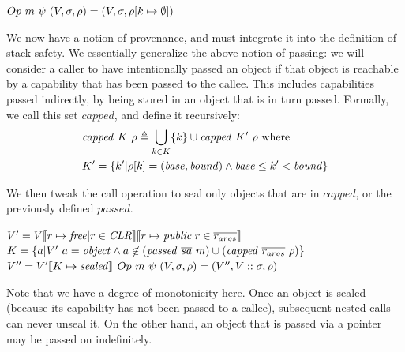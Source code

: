 \documentclass[10pt,conference]{ieeetran}%
\theoremstyle{definition}
\begin{document}
         {\(Op ~ m ~ \psi ~ (V,\sigma,\rho) = (V,\sigma,\rho[k \mapsto \emptyset])\)}

We now have a notion of provenance, and must integrate it into the definition of
stack safety. We essentially generalize the above notion of passing: we will consider
a caller to have intentionally passed an object if that object is reachable by
a capability that has been passed to the callee. This includes capabilities passed
indirectly, by being stored in an object that is in turn passed. Formally, we call
this set \(\mathit{capped}\), and define it recursively:
%
\[\begin{split}
& \mathit{capped} ~ K ~ \rho \triangleq \bigcup_{k \in K} \{k\} \cup \mathit{capped} ~ K' ~ \rho \textnormal{ where} \\
& K' = \{k' |\rho[k] = (\mathit{base},\mathit{bound})
\land \mathit{base} \leq k' < \mathit{bound}\} \\
\end{split}\]

We then tweak the call operation to seal only objects that are in \(\mathit{capped}\), or
the previously defined \(\mathit{passed}\).

               {\(V' = V \llbracket r \mapsto \mathit{free} | r \in \mathit{CLR} \rrbracket
                 \llbracket r \mapsto \mathit{public} | r \in \overline{r_{args}} \rrbracket\)}
               {\(K = \{a | V' ~ a = \mathit{object} \land a \not \in (\mathit{passed} ~ \overline{sa} ~ m) \cup (\mathit{capped} ~ \overline{r_{args}} ~ \rho) \}\)}
               {\(V'' = V'\llbracket K \mapsto \mathit{sealed} \rrbracket\)}
               {\(Op ~ m ~ \psi ~ (V,\sigma,\rho) =
                 (V'',V::\sigma,\rho)\)}

Note that we have a degree of monotonicity here. Once an object is sealed (because its
capability has not been passed to a callee), subsequent nested calls can never unseal it.
On the other hand, an object that is passed via a pointer may be passed on indefinitely.
              
\end{document}
